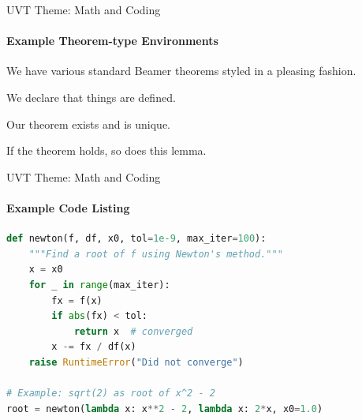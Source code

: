 \documentclass[aspectratio=169, t]{beamer}
\begin{document}
\begin{frame}{UVT Theme: Math and Coding}
\framesubtitle{Example Theorem-type Environments}

We have various standard Beamer theorems styled in a pleasing fashion.

\vfill

\begin{definition}
We declare that things are defined.
\end{definition}

\vfill

\begin{theorem}
Our theorem exists and is unique.
\end{theorem}

\vfill

\begin{lemma}
If the theorem holds, so does this lemma.
\end{lemma}

\vfill

\end{frame}

\begin{frame}[fragile]{UVT Theme: Math and Coding}
\framesubtitle{Example Code Listing}

\begin{lstlisting}[language=Python,
                   caption={Newton's method in Python},
                   linewidth=0.9\textwidth,
                   xleftmargin=0.1\textwidth,
                   basicstyle=\ttfamily\footnotesize]
def newton(f, df, x0, tol=1e-9, max_iter=100):
    """Find a root of f using Newton's method."""
    x = x0
    for _ in range(max_iter):
        fx = f(x)
        if abs(fx) < tol:
            return x  # converged
        x -= fx / df(x)
    raise RuntimeError("Did not converge")

# Example: sqrt(2) as root of x^2 - 2
root = newton(lambda x: x**2 - 2, lambda x: 2*x, x0=1.0)
\end{lstlisting}

\end{frame}
\end{document}
